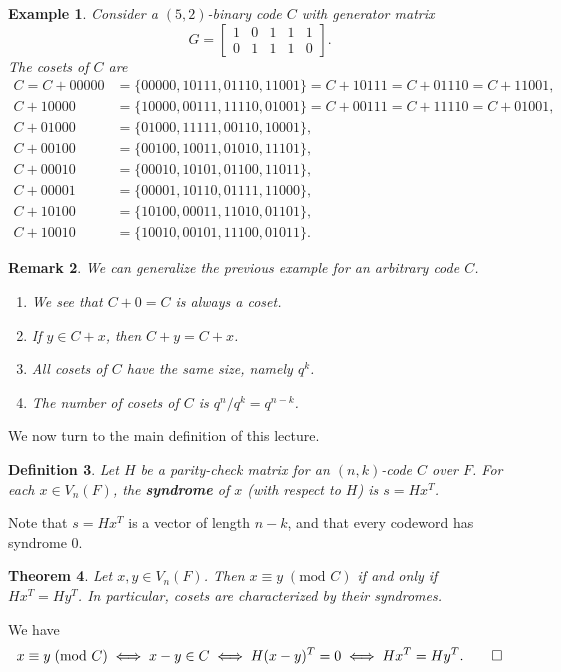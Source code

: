 \documentclass[10pt]{article}
\makeatletter
\theoremstyle{newstyle}
\newtheorem{thm}{Theorem}[subsection]
\newtheorem{remark}[thm]{Remark}
\newtheorem{defn}[thm]{Definition}
\newtheorem{exmp}[thm]{Example}
\newenvironment{pf}[1][\proofname]{\par
  \pushQED{\qed}%
  \normalfont \topsep0\p@\relax
  \trivlist
  \item[\hskip\labelsep\scshape
  #1\@addpunct{.}]\ignorespaces
}{%
  \popQED\endtrivlist\@endpefalse
}
\makeatother
\begin{document}
\begin{exmp}
Consider a $(5, 2)$-binary code $C$ with generator matrix 
\[ G = \begin{bmatrix} 1 & 0 & 1 & 1 & 1 \\ 0 & 1 & 1 & 1 & 0 \end{bmatrix}. \]
The cosets of $C$ are 
\begin{align*}
    C = C + 00000 &= \{00000, 10111, 01110, 11001\} = C + 10111 = C + 01110 = C + 11001, \\
    C + 10000 &= \{10000, 00111, 11110, 01001\} = C + 00111 = C + 11110 = C + 01001, \\
    C + 01000 &= \{01000, 11111, 00110, 10001\}, \\
    C + 00100 &= \{00100, 10011, 01010, 11101\}, \\
    C + 00010 &= \{00010, 10101, 01100, 11011\}, \\
    C + 00001 &= \{00001, 10110, 01111, 11000\}, \\
    C + 10100 &= \{10100, 00011, 11010, 01101\}, \\
    C + 10010 &= \{10010, 00101, 11100, 01011\}.
\end{align*}
\end{exmp}

\begin{remark}
We can generalize the previous example for an arbitrary code $C$. 
\begin{enumerate}[(1)]
    \item We see that $C + 0 = C$ is always a coset. 
    \item If $y \in C + x$, then $C + y = C + x$.
    \item All cosets of $C$ have the same size, namely $q^k$. 
    \item The number of cosets of $C$ is $q^n/q^k = q^{n-k}$. 
\end{enumerate}
\end{remark}

We now turn to the main definition of this lecture. 

\begin{defn}
Let $H$ be a parity-check matrix for an $(n, k)$-code $C$ over $F$. For each $x \in V_n(F)$, the 
{\bf syndrome} of $x$ (with respect to $H$) is $s = Hx^T$. 
\end{defn}

Note that $s = Hx^T$ is a vector of length $n-k$, and that every codeword has syndrome $0$. 

\begin{thm}
Let $x, y \in V_n(F)$. Then $x \equiv y \; (\text{mod } C)$ if and only if $Hx^T = Hy^T$. 
In particular, cosets are characterized by their syndromes.
\end{thm}
\begin{pf}
We have 
\[ x \equiv y \; (\text{mod } C) \iff x-y \in C \iff H(x-y)^T = 0 \iff Hx^T = Hy^T. \qedhere \]
\end{pf}
\end{document}
